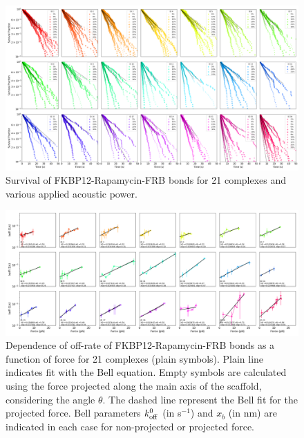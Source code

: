 \documentclass{biophys-new}
\begin{document}



\begin{figure}
	\centering
	\centerline {\includegraphics[width=1\linewidth]{Figures/multisurvival2Bis_Rapa.png}}
	\caption{Survival of FKBP12-Rapamycin-FRB bonds for 21 complexes and various applied acoustic power.}
	\label{fig:MultiSurvival}	
\end{figure}

\begin{figure}
	\centering
	\centerline {\includegraphics[width=1\linewidth]{Figures/offrate_vs_forceBis_Rapa.png}}
	\caption{Dependence of off-rate of FKBP12-Rapamycin-FRB bonds as a function of force for 21 complexes (plain symbols). Plain line indicates fit with the Bell equation. Empty symbols are calculated using the force projected along the main axis of the scaffold, considering the angle $\theta$. The dashed line represent the Bell fit for the projected force. Bell parameters $k^0_{\rm off}$ (in s$^{-1}$) and $x_b$ (in nm) are indicated in each case for non-projected or projected force. }
	\label{fig:offrate_force}	
\end{figure}
\end{document}
